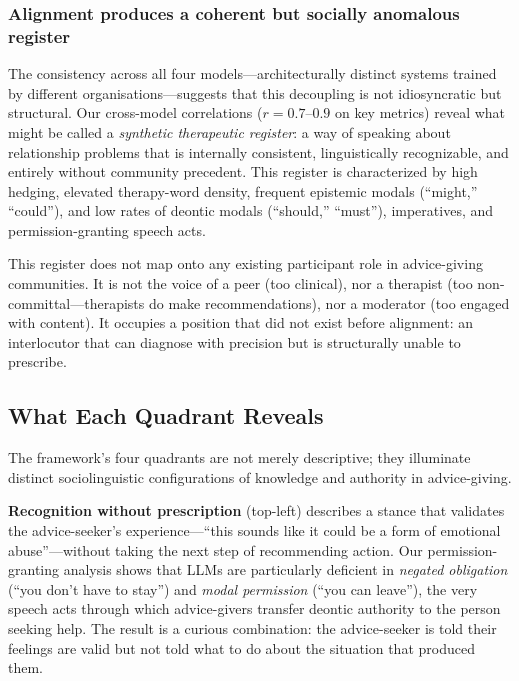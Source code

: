 \subsubsection{Alignment produces a coherent but socially anomalous register}

The consistency across all four models---architecturally distinct systems trained by different organisations---suggests that this decoupling is not idiosyncratic but structural. Our cross-model correlations ($r = 0.7$--$0.9$ on key metrics) reveal what might be called a \textit{synthetic therapeutic register}: a way of speaking about relationship problems that is internally consistent, linguistically recognizable, and entirely without community precedent. This register is characterized by high hedging, elevated therapy-word density, frequent epistemic modals (``might,'' ``could''), and low rates of deontic modals (``should,'' ``must''), imperatives, and permission-granting speech acts.

This register does not map onto any existing participant role in advice-giving communities. It is not the voice of a peer (too clinical), nor a therapist (too non-committal---therapists do make recommendations), nor a moderator (too engaged with content). It occupies a position that did not exist before alignment: an interlocutor that can diagnose with precision but is structurally unable to prescribe.

\subsection{What Each Quadrant Reveals}

The framework's four quadrants are not merely descriptive; they illuminate distinct sociolinguistic configurations of knowledge and authority in advice-giving.

\textbf{Recognition without prescription} (top-left) describes a stance that validates the advice-seeker's experience---``this sounds like it could be a form of emotional abuse''---without taking the next step of recommending action. Our permission-granting analysis shows that LLMs are particularly deficient in \textit{negated obligation} (``you don't have to stay'') and \textit{modal permission} (``you can leave''), the very speech acts through which advice-givers transfer deontic authority to the person seeking help. The result is a curious combination: the advice-seeker is told their feelings are valid but not told what to do about the situation that produced them.

